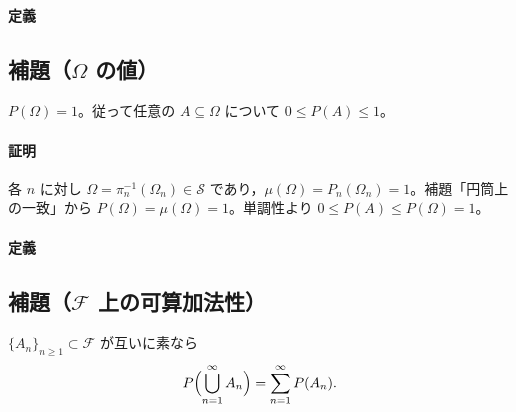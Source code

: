 \documentclass[uplatex,dvipdfmx,11pt,a4paper,openany]{bxjsbook}
\begin{document}
\paragraph{定義}
\subsection{補題（\(\Omega\) の値）}
\(P(\Omega)=1\)。従って任意の \(A\subseteq\Omega\) について \(0\le P(A)\le 1\)。

\paragraph{証明}
各 \(n\) に対し \(\Omega=\pi_n^{-1}(\Omega_n)\in\mathcal{S}\) であり，\(\mu(\Omega)=P_n(\Omega_n)=1\)。補題「円筒上の一致」から
                        \(P(\Omega)=\mu(\Omega)=1\)。単調性より \(0\le P(A)\le P(\Omega)=1\)。



\paragraph{定義}
\subsection{補題（\(\mathcal{F}\) 上の可算加法性）}
\(\{A_n\}_{n\ge1}\subset\mathcal{F}\) が互いに素なら
                    \[P\Bigl(\bigcup_{n=1}^{\infty} A_n\Bigr)=\sum_{n=1}^{\infty} P(A_n).\]
\end{document}

